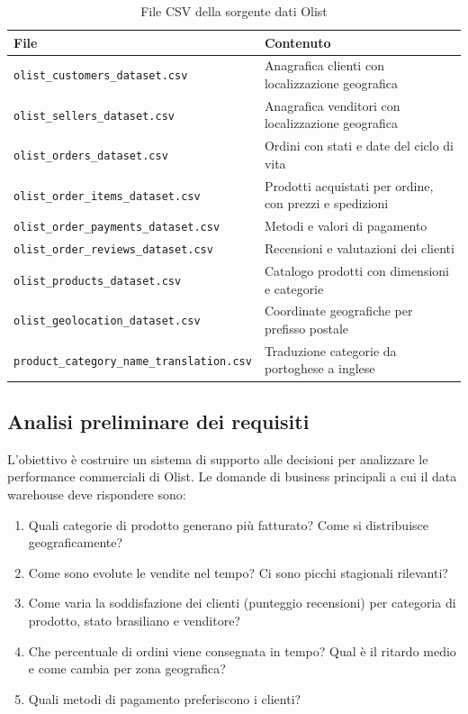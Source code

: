\documentclass[12pt,a4paper]{article}
\begin{document}
\begin{table}[H]
  \centering
  \caption{File CSV della sorgente dati Olist}
  \label{tab:csv}
  \begin{tabular}{ll}
    \toprule
    \textbf{File} & \textbf{Contenuto} \\
    \midrule
    \texttt{olist\_customers\_dataset.csv}         & Anagrafica clienti con localizzazione geografica \\
    \texttt{olist\_sellers\_dataset.csv}            & Anagrafica venditori con localizzazione geografica \\
    \texttt{olist\_orders\_dataset.csv}             & Ordini con stati e date del ciclo di vita \\
    \texttt{olist\_order\_items\_dataset.csv}       & Prodotti acquistati per ordine, con prezzi e spedizioni \\
    \texttt{olist\_order\_payments\_dataset.csv}    & Metodi e valori di pagamento \\
    \texttt{olist\_order\_reviews\_dataset.csv}     & Recensioni e valutazioni dei clienti \\
    \texttt{olist\_products\_dataset.csv}           & Catalogo prodotti con dimensioni e categorie \\
    \texttt{olist\_geolocation\_dataset.csv}        & Coordinate geografiche per prefisso postale \\
    \texttt{product\_category\_name\_translation.csv} & Traduzione categorie da portoghese a inglese \\
    \bottomrule
  \end{tabular}
\end{table}

\subsection{Analisi preliminare dei requisiti}

L'obiettivo è costruire un sistema di supporto alle decisioni per analizzare le
performance commerciali di Olist. Le domande di business principali a cui il data
warehouse deve rispondere sono:

\begin{enumerate}
  \item Quali categorie di prodotto generano più fatturato? Come si distribuisce
        geograficamente?
  \item Come sono evolute le vendite nel tempo? Ci sono picchi stagionali rilevanti?
  \item Come varia la soddisfazione dei clienti (punteggio recensioni) per categoria di
        prodotto, stato brasiliano e venditore?
  \item Che percentuale di ordini viene consegnata in tempo? Qual è il ritardo medio
        e come cambia per zona geografica?
  \item Quali metodi di pagamento preferiscono i clienti?
\end{enumerate}
\end{document}
